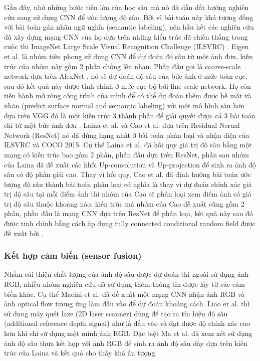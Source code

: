 Gần đây, nhờ những bước tiến lớn của học sâu mà nó đã dẫn dắt hướng nghiên cứu sang sử dụng CNN để ước lượng độ sâu. Bởi vì bài toán này khá tương đồng với bài toán gán nhãn ngữ nghĩa (semantic labeling), nên hầu hết các nghiên cứu đã xây dựng mạng CNN của họ dựa trên những kiến trúc đã chiến thắng trong cuộc thi ImageNet Large Scale Visual Recognition Challenge (ILSVRC) \cite{Imagenet}. Eigen et al. \cite{Eigen2014} là nhóm tiên phong sử dụng CNN để dự đoán độ sâu từ một ảnh đơn, kiến trúc của nhóm này gồm 2 phần chồng lên nhau. Phần đầu gọi là coarse-scale network dựa trên AlexNet \cite{Krizhevsky2012}, nó sẽ dự đoán độ sâu của bức ảnh ở mức toàn cục, sau đó kết quả này được tinh chỉnh ở mức cục bộ bởi fine-scale network. Họ còn tiến hành mở rộng công trình của mình để có thể dự đoán thêm được bề mặt và nhãn (predict surface normal and semantic labeling) với một mô hình sâu hơn dựa trên VGG \cite{Simonyan2014} đó là một kiến trúc 3 thành phần để giải quyết được cả 3 bài toán chỉ từ một bức ảnh đơn \cite{Eigen2015}. Laina et al. \cite{laina2016deeper} và Cao et al. \cite{cao2017estimating} dựa trên Residual Nerual Network (ResNet) \cite{KHe2015} nó đã đứng hạng nhất ở bài toán phân loại và nhận diện của ILSVRC và COCO 2015. Cụ thể Laina et al. \cite{laina2016deeper} đã hồi quy giá trị độ sâu bằng một mạng có kiến trúc bao gồm 2 phần, phần đầu dựa trên ResNet, phần sau nhóm của Laina đã đề xuất các khối Up-convolution và Up-projection để sinh ra ảnh độ sâu có độ phân giải cao. Thay vì hồi quy, Cao et al. \cite{cao2017estimating} đã định hướng bài toán ước lượng độ sâu thành bài toán phân loại có nghĩa là thay vì dự đoán chính xác giá trị độ sâu tại mỗi điểm ảnh thì nhóm của Cao sẽ phân loại xem điểm ảnh có giá trị độ sâu thuộc khoảng nào, kiến trúc mà nhóm của Cao đề xuất cũng gồm 2 phần, phần đầu là mạng CNN dựa trên ResNet để phân loại, kết quả này sau đó được tinh chỉnh bằng cách áp dụng fully connected conditional random field được đề xuất bởi \cite{krahenbuhl2011efficient}.

\subsubsection{Kết hợp cảm biến (sensor fusion)}
Nhằm cải thiện chất lượng của ảnh độ sâu được dự đoán thì ngoài sử dụng ảnh RGB, nhiều nhóm nghiên cứu đã sử dụng thêm thông tin được lấy từ các cảm biến khác. Cụ thể  Macini et al.  \cite{mancini2016fast} đã đề xuất một mạng CNN nhận ảnh RGB và ảnh optical flow tương ứng làm đầu vào để dự đoán khoảng cách. Liao et al. \cite{liao2017parse} thì sử dụng máy quét laze (2D laser scanner) dùng để tạo ra tín hiệu độ sâu (additional reference depth signal) như là đầu vào và đạt được độ chính xác cao hơn khi chỉ sử dụng một mình ảnh RGB. Đặc biệt Ma et al. \cite{Ma2017SparseToDense} đã xem xét sử dụng ảnh độ sâu thưa kết hợp với ảnh RGB để sinh ra ảnh độ sâu dày dựa trên kiến trúc của Laina \cite{laina2016deeper} và kết quả cho thấy khá ấn tượng.\\

